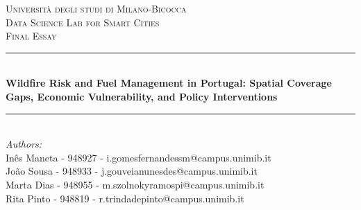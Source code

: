 \begin{titlepage}

\newcommand{\HRule}{\rule{\linewidth}{0.5mm}} %

\center %
 

\textsc{\LARGE Università degli studi di Milano-Bicocca}\\[1cm] %
\textsc{\Large Data Science Lab for Smart Cities}\\[0.3cm] %
\textsc{\large Final Essay}\\[0.1cm] %


\HRule \\[0.4cm]
{ \huge \bfseries Wildfire Risk and Fuel Management in Portugal: Spatial Coverage Gaps, Economic Vulnerability, and Policy Interventions}\\[0.4cm] %
\HRule \\[1.5cm]
 

\large
\emph{Authors:}\\

Inês Maneta - 948927 - i.gomesfernandessm@campus.unimib.it\\

João Sousa - 948933 - j.gouveianunesdes@campus.unimib.it\\

Marta Dias - 948955 - m.szolnokyramospi@campus.unimib.it\\

Rita Pinto - 948819 - r.trindadepinto@campus.unimib.it\\[1cm]



\end{titlepage}
